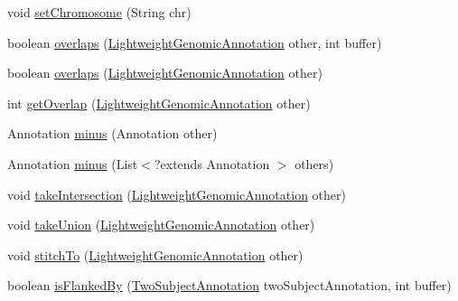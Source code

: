 \begin{DoxyCompactItemize}
\item 
void \hyperlink{classbroad_1_1core_1_1sequence_1_1_sequence_region_a0be1547c74c577c331f647a599a5f830}{set\+Chromosome} (String chr)
\item 
boolean \hyperlink{classbroad_1_1core_1_1sequence_1_1_sequence_region_aa50cb02d4f02724f425587a5dc162190}{overlaps} (\hyperlink{interfacebroad_1_1core_1_1annotation_1_1_lightweight_genomic_annotation}{Lightweight\+Genomic\+Annotation} other, int buffer)
\item 
boolean \hyperlink{classbroad_1_1core_1_1sequence_1_1_sequence_region_a06379c6b177a47acbc18b9ceb6f3a3f4}{overlaps} (\hyperlink{interfacebroad_1_1core_1_1annotation_1_1_lightweight_genomic_annotation}{Lightweight\+Genomic\+Annotation} other)
\item 
int \hyperlink{classbroad_1_1core_1_1sequence_1_1_sequence_region_af2e91a26d22501beed8d7c3d5a7b5d26}{get\+Overlap} (\hyperlink{interfacebroad_1_1core_1_1annotation_1_1_lightweight_genomic_annotation}{Lightweight\+Genomic\+Annotation} other)
\item 
Annotation \hyperlink{classbroad_1_1core_1_1sequence_1_1_sequence_region_aa1083261427ff062906ebddc093fdec3}{minus} (Annotation other)
\item 
Annotation \hyperlink{classbroad_1_1core_1_1sequence_1_1_sequence_region_ac9e6b481971a4176ed161d03c79cd8c7}{minus} (List$<$?extends Annotation $>$ others)
\item 
void \hyperlink{classbroad_1_1core_1_1sequence_1_1_sequence_region_aeedabc730475307996eb9f914bfedb4a}{take\+Intersection} (\hyperlink{interfacebroad_1_1core_1_1annotation_1_1_lightweight_genomic_annotation}{Lightweight\+Genomic\+Annotation} other)
\item 
void \hyperlink{classbroad_1_1core_1_1sequence_1_1_sequence_region_aa5b41c3b7cab0156dbaad0eb581b6b8e}{take\+Union} (\hyperlink{interfacebroad_1_1core_1_1annotation_1_1_lightweight_genomic_annotation}{Lightweight\+Genomic\+Annotation} other)
\item 
void \hyperlink{classbroad_1_1core_1_1sequence_1_1_sequence_region_a1d97f790e022d82eedf0d1daba962d01}{stitch\+To} (\hyperlink{interfacebroad_1_1core_1_1annotation_1_1_lightweight_genomic_annotation}{Lightweight\+Genomic\+Annotation} other)
\item 
boolean \hyperlink{classbroad_1_1core_1_1sequence_1_1_sequence_region_a33988f05eed5e8868dbd8aadeb9e073a}{is\+Flanked\+By} (\hyperlink{interfacebroad_1_1core_1_1annotation_1_1_two_subject_annotation}{Two\+Subject\+Annotation} two\+Subject\+Annotation, int buffer)

\end{DoxyCompactItemize}
